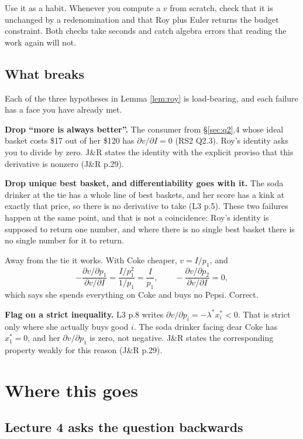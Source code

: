 \documentclass[11pt,letterpaper]{article}
\theoremstyle{definition}
\theoremstyle{plain}
\newcommand{\src}[1]{{\small\textsf{(#1)}}}
\begin{document}
Use it as a habit. Whenever you compute a $v$ from scratch, check that it is unchanged by a
redenomination and that Roy plus Euler returns the budget constraint. Both checks take seconds and
catch algebra errors that reading the work again will not.

\subsection{What breaks}

Each of the three hypotheses in Lemma \ref{lem:roy} is load-bearing, and each failure has a face you
have already met.

\textbf{Drop ``more is always better''.} The consumer from \S\ref{sec:q2}.4 whose ideal basket costs
\$17 out of her \$120 has $\partial v / \partial I = 0$ \src{RS2 Q2.3}. Roy's identity asks you to
divide by zero. J\&R states the identity with the explicit proviso that this derivative is nonzero
\src{J\&R p.29}.

\textbf{Drop unique best basket, and differentiability goes with it.} The soda drinker at the tie has
a whole line of best baskets, and her score has a kink at exactly that price, so there is no
derivative to take \src{L3 p.5}. These two failures happen at the same point, and that is not a
coincidence: Roy's identity is supposed to return one number, and where there is no single best
basket there is no single number for it to return.

Away from the tie it works. With Coke cheaper, $v = I/p_1$, and
\[
- \frac{\partial v / \partial p_1}{\partial v / \partial I} = \frac{I/p_1^2}{1/p_1} = \frac{I}{p_1},
\qquad
- \frac{\partial v / \partial p_2}{\partial v / \partial I} = 0,
\]
which says she spends everything on Coke and buys no Pepsi. Correct.

\begin{snugshade}
\noindent\textbf{Flag on a strict inequality.} L3 p.8 writes
$\partial v / \partial p_i = -\lambda^* x_i^* < 0$. That is strict only where she actually buys good
$i$. The soda drinker facing dear Coke has $x_1^* = 0$, and her $\partial v / \partial p_1$ is zero,
not negative. J\&R states the corresponding property weakly for this reason \src{J\&R p.29}.
\end{snugshade}
\section{Where this goes}

\subsection{Lecture 4 asks the question backwards}
\end{document}
